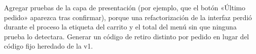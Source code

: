 Agregar pruebas de la capa de presentación (por ejemplo, que el botón «Último pedido» aparezca tras confirmar), porque una refactorización de la interfaz perdió durante el proceso la etiqueta del carrito y el total del menú sin que ninguna prueba lo detectara. Generar un código de retiro distinto por pedido en lugar del código fijo heredado de la v1.
